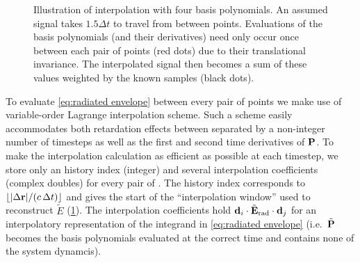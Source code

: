 \begin{figure}
  
  \caption{\label{fig:interpolation}Illustration of interpolation with four basis polynomials.
    An assumed signal takes $1.5\Delta t$ to travel from between points.
    Evaluations of the basis polynomials (and their derivatives) need only occur once between each pair of points (red dots) due to their translational invariance.
    The interpolated signal then becomes a sum of these values weighted by the known samples (black dots).
  }
\end{figure}

To evaluate \cref{eq:radiated envelope} between every pair of points we make use of variable-order Lagrange interpolation scheme.
Such a scheme easily accommodates both retardation effects between \qds{} separated by a non-integer number of timesteps as well as the first and second time derivatives of $\vb{P}$.
To make the interpolation calculation as efficient as possible at each timestep, we store only an history index (integer) and several interpolation coefficients (complex doubles) for every pair of \qds{}.
The history index corresponds to $\lfloor \abs{\Delta \vb{r}}/(c \, \Delta t) \rfloor$ and gives the start of the ``interpolation window'' used to reconstruct $\tilde{E}$ (\cref{fig:interpolation}).
The interpolation coefficients hold $\vb{d}_i \cdot \tilde{\vb{E}}_\text{rad} \cdot \vb{d}_j$ for an interpolatory representation of the integrand in \cref{eq:radiated envelope} (i.e.\ $\tilde{\vb{P}}$ becomes the basis polynomials evaluated at the correct time and contains none of the system dynamcis).

